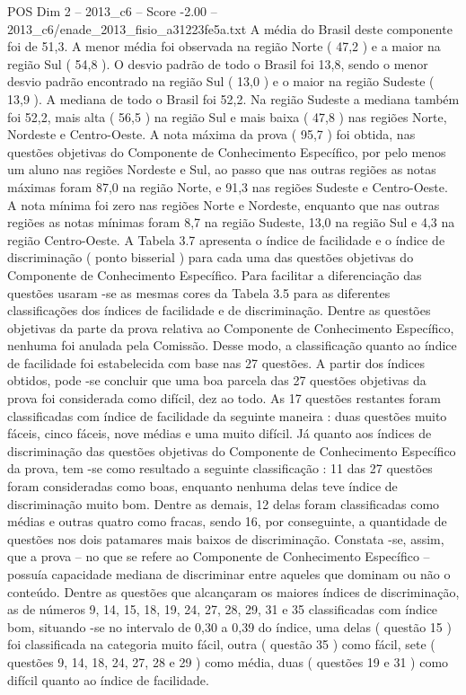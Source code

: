 \begin{textsample}{POS Dim 2 – 2013\_c6 – Score -2.00 – 2013\_c6/enade\_2013\_fisio\_a31223fe5a.txt}
A média do Brasil deste componente foi de 51,3.
A menor média foi observada na região Norte ( 47,2 ) e a maior na região Sul ( 54,8 ).
O desvio padrão de todo o Brasil foi 13,8, sendo o menor desvio padrão encontrado na região Sul ( 13,0 ) e o maior na região Sudeste ( 13,9 ).
A mediana de todo o Brasil foi 52,2.
Na região Sudeste a mediana também foi 52,2, mais alta ( 56,5 ) na região Sul e mais baixa ( 47,8 ) nas regiões Norte, Nordeste e Centro-Oeste.
A nota máxima da prova ( 95,7 ) foi obtida, nas questões objetivas do Componente de Conhecimento Específico, por pelo menos um aluno nas regiões Nordeste e Sul, ao passo que nas outras regiões as notas máximas foram 87,0 na região Norte, e 91,3 nas regiões Sudeste e Centro-Oeste.
A nota mínima foi zero nas regiões Norte e Nordeste, enquanto que nas outras regiões as notas mínimas foram 8,7 na região Sudeste, 13,0 na região Sul e 4,3 na região Centro-Oeste.
A Tabela 3.7 apresenta o índice de facilidade e o índice de discriminação ( ponto bisserial ) para cada uma das questões objetivas do Componente de Conhecimento Específico.
Para facilitar a diferenciação das questões usaram -se as mesmas cores da Tabela 3.5 para as diferentes classificações dos índices de facilidade e de discriminação.
Dentre as questões objetivas da parte da prova relativa ao Componente de Conhecimento Específico, nenhuma foi anulada pela Comissão.
Desse modo, a classificação quanto ao índice de facilidade foi estabelecida com base nas 27 questões.
A partir dos índices obtidos, pode -se concluir que uma boa parcela das 27 questões objetivas da prova foi considerada como difícil, dez ao todo.
As 17 questões restantes foram classificadas com índice de facilidade da seguinte maneira : duas questões muito fáceis, cinco fáceis, nove médias e uma muito difícil.
Já quanto aos índices de discriminação das questões objetivas do Componente de Conhecimento Específico da prova, tem -se como resultado a seguinte classificação : 11 das 27 questões foram consideradas como boas, enquanto nenhuma delas teve índice de discriminação muito bom.
Dentre as demais, 12 delas foram classificadas como médias e outras quatro como fracas, sendo 16, por conseguinte, a quantidade de questões nos dois patamares mais baixos de discriminação.
Constata -se, assim, que a prova – no que se refere ao Componente de Conhecimento Específico – possuía capacidade mediana de discriminar entre aqueles que dominam ou não o conteúdo.
Dentre as questões que alcançaram os maiores índices de discriminação, as de números 9, 14, 15, 18, 19, 24, 27, 28, 29, 31 e 35 classificadas com índice bom, situando -se no intervalo de 0,30 a 0,39 do índice, uma delas ( questão 15 ) foi classificada na categoria muito fácil, outra ( questão 35 ) como fácil, sete ( questões 9, 14, 18, 24, 27, 28 e 29 ) como média, duas ( questões 19 e 31 ) como difícil quanto ao índice de facilidade.

\end{textsample}
